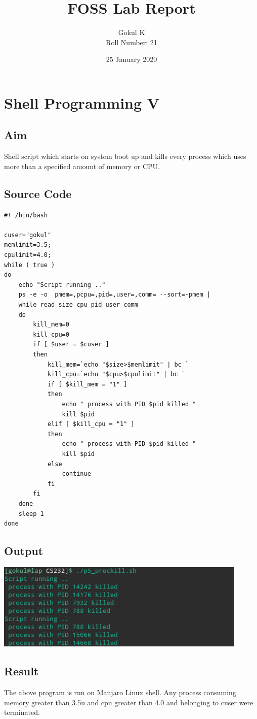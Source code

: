\documentclass{article}
\begin{document}
\title{FOSS Lab Report}
\author{Gokul K\\[2\baselineskip]
Roll Number: 21\\[2\baselineskip]}
\date{25 January 2020}

\maketitle

\setcounter{section}{8}
\section{Shell Programming V}
\subsection{Aim}
Shell script which starts on system boot up and kills every process which uses more
than a specified amount of memory or CPU.

\subsection{Source Code}
\begin{verbatim}
#! /bin/bash

cuser="gokul"
memlimit=3.5;
cpulimit=4.0;
while ( true )
do
    echo "Script running .."
    ps -e -o  pmem=,pcpu=,pid=,user=,comm= --sort=-pmem |
    while read size cpu pid user comm
    do
        kill_mem=0
        kill_cpu=0
        if [ $user = $cuser ]
        then
            kill_mem=`echo "$size>$memlimit" | bc `
            kill_cpu=`echo "$cpu>$cpulimit" | bc `
            if [ $kill_mem = "1" ]
            then
                echo " process with PID $pid killed "
                kill $pid
            elif [ $kill_cpu = "1" ]
            then
                echo " process with PID $pid killed "
                kill $pid
            else
                continue
            fi
        fi
    done
    sleep 1
done

\end{verbatim}

\subsection{Output}
\includegraphics[width=0.9\textwidth]{img/p9/ss.png}\newline

\subsection{Result}
The above program is run on Manjaro Linux shell. Any process consuming memory greater than 3.5u and cpu greater than 4.0 and belonging to cuser were terminated.
\end{document}
